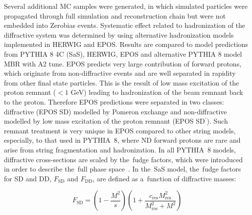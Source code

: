 
Several additional MC samples were generated, in which  simulated particles were propagated through full simulation and reconstruction chain but were  not embedded  into Zerobias events.   
Systematic effect related to hadronization of the diffractive system was determined by using alternative hadronization models implemented in HERWIG and EPOS. Results are compared to model predictions from PYTHIA 8 4C (\ac{SaS}), HERWIG, EPOS and alternative PYTHIA 8 model  \ac{MBR}  with A2 tune. EPOS predicts very large contribution of forward 
protons, which originate from non-diffractive events and are well separated in rapidity from other final state particles. This is the result of low mass excitation of the proton remnant ($<1$ GeV) leading to hadronization of the beam remnant back to the proton. Therefore EPOS predictions were separated in two classes: diffractive (EPOS SD) modelled by Pomeron exchange and non-diffractive modelled  by low mass excitation of the proton remnant (EPOS SD$^\prime$). Such remnant treatment is very unique in EPOS compared to other string models, especially, to that used in PYTHIA~8, where \ac{ND} forward protons are rare 
and  arise from string fragmentation and hadronization. In all PYTHIA~8 models, diffractive cross-sections are scaled by the~fudge factors, which were introduced in order to describe the~full phase space~\cite{Sjostrand:2006za,MBR:intro}. In the~\ac{SaS} model, the~fudge factors for SD and DD,  $F_{\textrm{SD}}$ and $F_{\textrm{DD}}$, are defined as a~function of diffractive masses:

\begin{equation}
F_{\textrm{SD}}=\left(1-\frac{M^2}{s}\right)\left(1+\frac{c_\textrm{res}M^2_\textrm{res}}{M^2_\textrm{res}+M^2}\right)
\end{equation}

